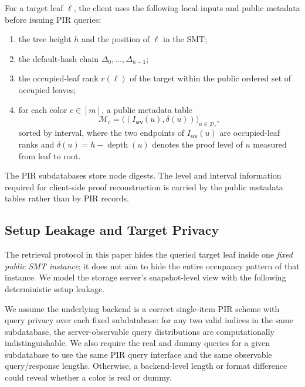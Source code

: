 \begin{definition}
For a target leaf $\ell$, the client uses the following local inputs and public metadata before issuing PIR queries:
\begin{enumerate}[leftmargin=2em]
  \item the tree height $h$ and the position of $\ell$ in the SMT;
  \item the default-hash chain $\Delta_0,\ldots,\Delta_{h-1}$;
  \item the occupied-leaf rank $r(\ell)$ of the target within the public ordered set of occupied leaves;
  \item for each color $c\in[m]$, a public metadata table
  \[
  \mathcal{M}_c=\bigl((I_{\mathsf{srv}}(u),\delta(u))\bigr)_{u\in\mathcal{D}_c},
  \]
  sorted by interval, where the two endpoints of $I_{\mathsf{srv}}(u)$ are occupied-leaf ranks and $\delta(u)=h-\operatorname{depth}(u)$ denotes the proof level of $u$ measured from leaf to root.
\end{enumerate}
\end{definition}

The PIR subdatabases store node digests. The level and interval information required for client-side proof reconstruction is carried by the public metadata tables rather than by PIR records.

\subsection{Setup Leakage and Target Privacy}

The retrieval protocol in this paper hides the queried target leaf inside one \emph{fixed public SMT instance}; it does not aim to hide the entire occupancy pattern of that instance. We model the storage server's snapshot-level view with the following deterministic setup leakage.

We assume the underlying backend is a correct single-item PIR scheme with query privacy over each fixed subdatabase: for any two valid indices in the same subdatabase, the server-observable query distributions are computationally indistinguishable. We also require the real and dummy queries for a given subdatabase to use the same PIR query interface and the same observable query/response lengths. Otherwise, a backend-level length or format difference could reveal whether a color is real or dummy.

